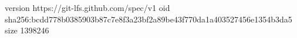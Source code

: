version https://git-lfs.github.com/spec/v1
oid sha256:bcdd778b0385903b87c7e8f3a23bf2a89be43f770da1a403527456e1354b3da5
size 1398246
